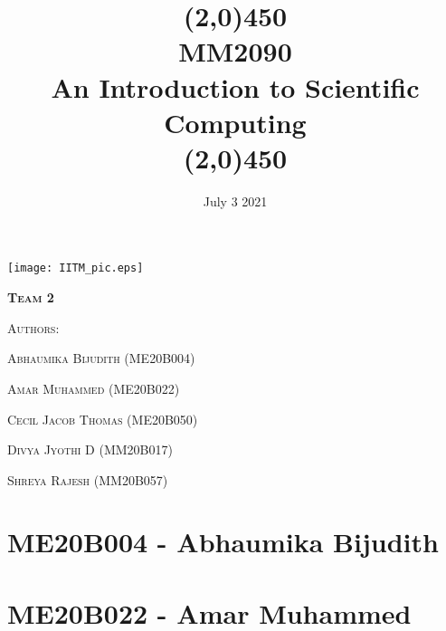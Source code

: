 \documentclass[12pt]{article}
\title{\line(2,0){450}\\ \bfseries{MM2090 \\ An Introduction to Scientific Computing }\\ \line(2,0){450}}
\date{}
\begin{document}
\begin{titlepage}
\maketitle
\begin{center}
	\texttt{[image: IITM\_pic.eps]}\par\vspace{1cm}
	\vspace{1cm}
	{\scshape\LARGE \textbf{Team 2} \par}
	\vspace{1cm}
	{\scshape\LARGE Authors: \par}
	\vspace{1cm}
	{\scshape Abhaumika Bijudith (ME20B004) \par}
	\vspace{0.5cm}
	{\scshape Amar Muhammed (ME20B022)     \par}
	\vspace{0.5cm}
	{\scshape Cecil Jacob Thomas (ME20B050) \par}
	\vspace{0.5cm}
	{\scshape Divya Jyothi D (MM20B017)	\par}
	\vspace{0.5cm}
	{\scshape Shreya Rajesh (MM20B057)	\par}
	\vfill
	\vfill

	{\large \date{July 3 2021}\par}
\end{center}
\end{titlepage}

\newpage

\tableofcontents

\newpage

\section{ME20B004 - Abhaumika Bijudith}

\newline
\section{ME20B022 - Amar Muhammed}

\newline
\end{document}

